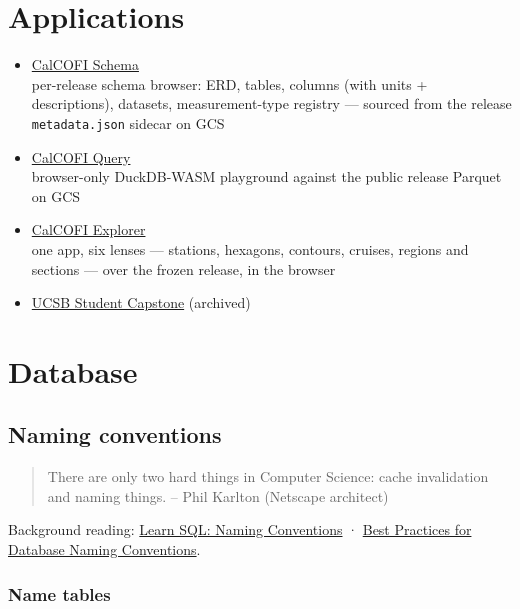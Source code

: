 \documentclass[
  letterpaper,
  DIV=11,
  numbers=noendperiod]{scrreprt}
\providecommand{\tightlist}{%
  \setlength{\itemsep}{0pt}\setlength{\parskip}{0pt}}
\begin{document}

\chapter{Applications}\label{applications}

\begin{itemize}
\tightlist
\item
  \href{https://calcofi.io/db-schema/}{CalCOFI Schema}\\
  per-release schema browser: ERD, tables, columns (with units +
  descriptions), datasets, measurement-type registry --- sourced from
  the release \texttt{metadata.json} sidecar on GCS
\item
  \href{https://calcofi.io/db-query/}{CalCOFI Query}\\
  browser-only DuckDB-WASM playground against the public release Parquet
  on GCS
\item
  \href{https://calcofi.io/explore/}{CalCOFI Explorer}\\
  one app, six lenses --- stations, hexagons, contours, cruises, regions
  and sections --- over the frozen release, in the browser
\item
  \href{https://app.calcofi.io/capstone/}{UCSB Student Capstone}
  (archived)
\end{itemize}


\chapter{Database}\label{database}

\section{Naming conventions}\label{naming-conventions}

\begin{quote}
There are only two hard things in Computer Science: cache invalidation
and naming things. -- Phil Karlton (Netscape architect)
\end{quote}

Background reading:
\href{https://www.sqlshack.com/learn-sql-naming-conventions/}{Learn SQL:
Naming Conventions} ·
\href{https://drygast.net/blog/post/database_naming_conventions}{Best
Practices for Database Naming Conventions}.

\subsection{Name tables}\label{name-tables}
\end{document}
